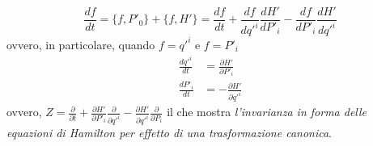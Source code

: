 \begin{equation*}
	\frac{df}{dt} = \{f, P'_0 \} + \{f, H' \} = \frac{df}{dt} + \frac{df}{dq'^i}\frac{dH'}{dP'_i} - \frac{df}{dP'_i}\frac{dH'}{dq'^i}
\end{equation*}
ovvero, in particolare, quando $ f = q'^i $ e $ f = P'_i $
\begin{align*}
	\frac{dq'^i}{dt} &= \frac{\partial H'}{\partial P'_i}\\
	\frac{dP'_i}{dt} &= - \frac{\partial H'}{\partial q'^i}
\end{align*}
ovvero, $ Z = \frac{\partial}{\partial t} + \frac{\partial H'}{\partial P'_i} \frac{\partial}{\partial q'^i} - \frac{\partial H'}{\partial q'^i} \frac{\partial}{\partial P_i} $
il che mostra \textit{l'invarianza in forma delle equazioni di Hamilton per effetto di una trasformazione canonica}.
